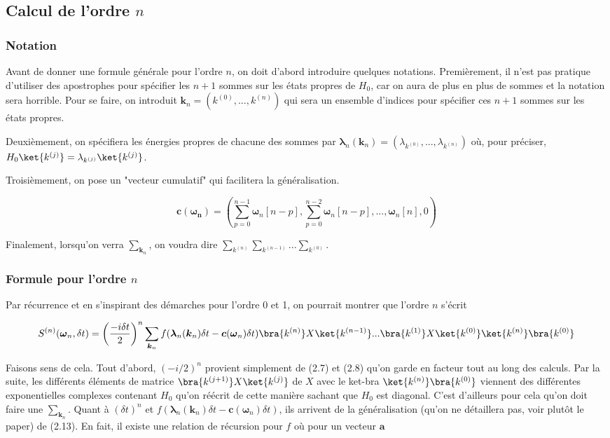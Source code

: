\subsection{Calcul de l'ordre $n$}
\subsubsection{Notation}
Avant de donner une formule générale pour l'ordre $n$, on doit d'abord introduire quelques notations. Premièrement, il n'est pas pratique d'utiliser des apostrophes pour spécifier les $n+1$ sommes sur les états propres de $H_0$, car on aura de plus en plus de sommes et la notation sera horrible. Pour se faire, on introduit $\boldsymbol{k}_n = (k^{(0)}, ..., k^{(n)})$ qui sera un ensemble d'indices pour spécifier ces $n+1$ sommes sur les états propres.

Deuxièmement, on spécifiera les énergies propres de chacune des sommes par $\boldsymbol{\lambda}_n(\boldsymbol{k}_n) = (\lambda_{k^{(0)}}, ..., \lambda_{k^{(n)}})$ où, pour préciser, $H_0\ket{k^{(j)}} = \lambda_{k^{(j)}}\ket{k^{(j)}}$.

Troisièmement, on pose un "vecteur cumulatif" qui facilitera la généralisation.

\begin{equation*}
    \boldsymbol{c}(\boldsymbol{\omega_n}) = \left(\sum_{p=0}^{n-1}\boldsymbol{\omega}_n[n-p], \sum_{p=0}^{n-2}\boldsymbol{\omega}_n[n-p], ..., \boldsymbol{\omega}_n[n], 0 \right)
\end{equation*}

Finalement, lorsqu'on verra $\sum_{\boldsymbol{k}_n}$, on voudra dire $\sum_{k^{(n)}}\sum_{k^{(n-1)}}...\sum_{k^{(0)}}$.

\subsubsection{Formule pour l'ordre $n$}
Par récurrence et en s'inspirant des démarches pour l'ordre 0 et 1, on pourrait montrer que l'ordre $n$ s'écrit

\begin{equation}
    S^{(n)}(\boldsymbol{\omega}_n, \delta t) = \left(\frac{-i \delta t}{2}\right)^n \sum_{\boldsymbol{k}_n} f(\boldsymbol{\lambda}_n(\boldsymbol{k}_n)\delta t - \boldsymbol{c}(\boldsymbol{\omega}_n)\delta t) \bra{k^{(n)}}X\ket{k^{(n-1)}}... \bra{k^{(1)}}X\ket{k^{(0)}} \ket{k^{(n)}}\bra{k^{(0)}}
\end{equation}

Faisons sens de cela. Tout d'abord, $(-i/2)^n$ provient simplement de (2.7) et (2.8) qu'on garde en facteur tout au long des calculs. Par la suite, les différents éléments de matrice $\bra{k^{(j+1)}}X\ket{k^{(j)}}$ de $X$ avec le ket-bra $\ket{k^{(n)}}\bra{k^{(0)}}$ viennent des différentes exponentielles complexes contenant $H_0$ qu'on réécrit de cette manière sachant que $H_0$ est diagonal. C'est d'ailleurs pour cela qu'on doit faire une $\sum_{\boldsymbol{k}_n}$. Quant à $(\delta t)^n$ et $f(\boldsymbol{\lambda}_n(\boldsymbol{k}_n)\delta t - \boldsymbol{c}(\boldsymbol{\omega}_n)\delta t)$, ils arrivent de la généralisation (qu'on ne détaillera pas, voir plutôt le paper) de (2.13). En fait, il existe une relation de récursion pour $f$ où pour un vecteur $\boldsymbol{a}$

